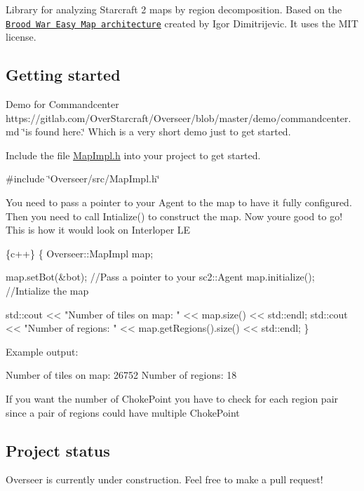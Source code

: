 

Library for analyzing Starcraft 2 maps by region decomposition. Based on the \href{http://bwem.sourceforge.net/}{\tt Brood War Easy Map architecture} created by Igor Dimitrijevic. It uses the M\+IT license.

\subsection*{Getting started}

Demo for Commandcenter https\+://gitlab.com/\+Over\+Starcraft/\+Overseer/blob/master/demo/commandcenter.\+md \char`\"{}is found here.\char`\"{} Which is a very short demo just to get started.

Include the file {\ttfamily \hyperlink{MapImpl_8h_source}{Map\+Impl.\+h}} into your project to get started.

{\ttfamily \#include \char`\"{}\+Overseer/src/\+Map\+Impl.\+h\char`\"{}}

You need to pass a pointer to your Agent to the map to have it fully configured. Then you need to call {\ttfamily Intialize()} to construct the map. Now you\textquotesingle{}re good to go! This is how it would look on Interloper LE


\begin{DoxyCode}
\{c++\}
\{
    Overseer::MapImpl map;

    map.setBot(&bot); //Pass a pointer to your sc2::Agent
    map.initialize(); //Intialize the map

    std::cout << "Number of tiles on map: " << map.size() << std::endl;
    std::cout << "Number of regions: " << map.getRegions().size() << std::endl;
\}
\end{DoxyCode}


Example output\+:


\begin{DoxyCode}
Number of tiles on map: 26752
Number of regions: 18
\end{DoxyCode}


If you want the number of {\ttfamily Choke\+Point} you have to check for each region pair since a pair of regions could have multiple {\ttfamily Choke\+Point}

\subsection*{Project status}

Overseer is currently under construction. Feel free to make a pull request!

